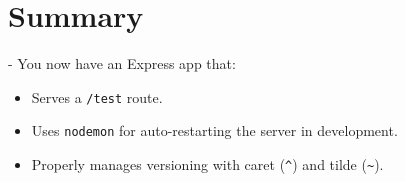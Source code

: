 \documentclass[a4paper,12pt]{article}
\begin{document}
\section*{Summary}
- You now have an Express app that:
    \begin{itemize}
        \item Serves a \texttt{/test} route.
        \item Uses \texttt{nodemon} for auto-restarting the server in development.
        \item Properly manages versioning with caret (\texttt{\^}) and tilde (\texttt{\~}).
    \end{itemize}
\end{document}
